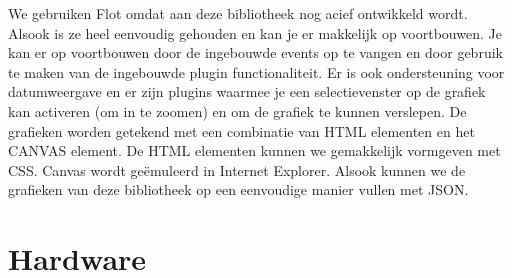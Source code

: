 We gebruiken Flot omdat aan deze bibliotheek nog acief ontwikkeld wordt. Alsook is ze heel eenvoudig gehouden en kan je er makkelijk op voortbouwen. Je kan er op voortbouwen door de ingebouwde events op te vangen en door gebruik te maken van de ingebouwde plugin functionaliteit. Er is ook ondersteuning voor datumweergave en er zijn plugins waarmee je een selectievenster op de grafiek kan activeren (om in te zoomen) en om de grafiek te kunnen verslepen.
De grafieken worden getekend met een combinatie van HTML elementen en het CANVAS element. De HTML elementen kunnen we gemakkelijk vormgeven met CSS. Canvas wordt ge\"emuleerd in Internet Explorer. Alsook kunnen we de grafieken van deze bibliotheek op een eenvoudige manier vullen met JSON.

\section{Hardware}

